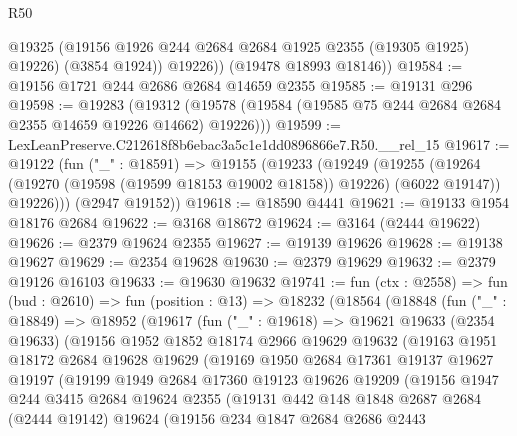 \begin{lexlean}{R50}
\begin{coremodule}
            @19325
            (@19156 @1926 @244 @2684 @2684 @1925 @2355 (@19305 @1925) @19226)
            (@3854 @1924))
          @19226))
      (@19478 @18993 @18146))
@19584 := @19156 @1721 @244 @2686 @2684 @14659 @2355
@19585 := @19131 @296
@19598 := @19283
    (@19312 (@19578 (@19584 (@19585 @75 @244 @2684 @2684 @2355 @14659 @19226 @14662) @19226)))
@19599 := LexLeanPreserve.C212618f8b6ebac3a5c1e1dd0896866e7.R50.__rel_15
@19617 := @19122
    (fun ("_" : @18591) =>
    @19155
      (@19233
        (@19249
          (@19255
            (@19264 (@19270 (@19598 (@19599 @18153 @19002 @18158)) @19226) (@6022 @19147))
            @19226)))
      (@2947 @19152))
@19618 := @18590 @4441
@19621 := @19133 @1954 @18176 @2684
@19622 := @3168 @18672
@19624 := @3164 (@2444 @19622)
@19626 := @2379 @19624 @2355
@19627 := @19139 @19626
@19628 := @19138 @19627
@19629 := @2354 @19628
@19630 := @2379 @19629
@19632 := @2379 @19126 @16103
@19633 := @19630 @19632
@19741 := fun (ctx : @2558) =>
  fun (bud : @2610) =>
  fun (position : @13) =>
  @18232
    (@18564
      (@18848
        (fun ("_" : @18849) =>
        @18952
          (@19617
            (fun ("_" : @19618) =>
            @19621
              @19633
              (@2354 @19633)
              (@19156
                @1952
                @1852
                @18174
                @2966
                @19629
                @19632
                (@19163
                  @1951
                  @18172
                  @2684
                  @19628
                  @19629
                  (@19169
                    @1950
                    @2684
                    @17361
                    @19137
                    @19627
                    @19197
                    (@19199
                      @1949
                      @2684
                      @17360
                      @19123
                      @19626
                      @19209
                      (@19156
                        @1947
                        @244
                        @3415
                        @2684
                        @19624
                        @2355
                        (@19131
                          @442
                          @148
                          @1848
                          @2687
                          @2684
                          (@2444 @19142)
                          @19624
                          (@19156
                            @234
                            @1847
                            @2684
                            @2686
                            @2443

\end{coremodule}
\end{lexlean}
